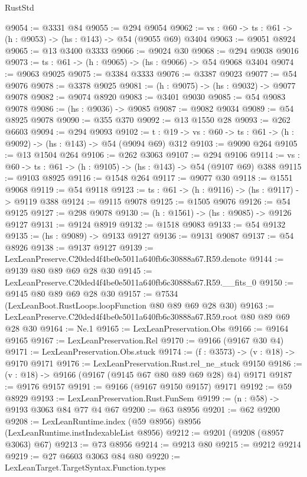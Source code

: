 \begin{lexlean}{RustStd}
\begin{coremodule}
@9054 := @3331 @84
@9055 := @294 @9054
@9062 := {vs : @60} -> {ts : @61} -> (h : @9053) -> (hs : @143) -> @54 (@9055 @69) @3404
@9063 := @9051 @8924
@9065 := @13 @3400 @3333
@9066 := @9024 @30
@9068 := @294 @9038 @9016
@9073 := {ts : @61} -> (h : @9065) -> (hs : @9066) -> @54 @9068 @3404
@9074 := @9063 @9025
@9075 := @3384 @3333
@9076 := @3387 @9023
@9077 := @54 @9076
@9078 := @3378 @9025
@9081 := (h : @9075) -> (hs : @9032) -> @9077 @9078
@9082 := @9074 @8920
@9083 := @3401 @9030
@9085 := @54 @9083 @9078
@9086 := (hs : @9036) -> @9085
@9087 := @9082 @9034
@9089 := @54 @8925 @9078
@9090 := @355 @370
@9092 := @13 @1550 @28
@9093 := @262 @6603
@9094 := @294 @9093
@9102 := {t : @19} -> {vs : @60} -> {ts : @61} -> (h : @9092) -> (hs : @143) -> @54 (@9094 @69) @312
@9103 := @9090 @264
@9105 := @13 @1504 @264
@9106 := @262 @3063
@9107 := @294 @9106
@9114 := {vs : @60} -> {ts : @61} -> (h : @9105) -> (hs : @143) -> @54 (@9107 @69) @388
@9115 := @9103 @8925
@9116 := @1548 @264
@9117 := @9077 @30
@9118 := @1551 @9068
@9119 := @54 @9118
@9123 := {ts : @61} -> (h : @9116) -> (hs : @9117) -> @9119 @388
@9124 := @9115 @9078
@9125 := @1505 @9076
@9126 := @54 @9125
@9127 := @298 @9078
@9130 := (h : @1561) -> (hs : @9085) -> @9126 @9127
@9131 := @9124 @8919
@9132 := @1518 @9083
@9133 := @54 @9132
@9135 := (hs : @9089) -> @9133 @9127
@9136 := @9131 @9087
@9137 := @54 @8926
@9138 := @9137 @9127
@9139 := LexLeanPreserve.C20ded4f4be0e5011a640fb6c30888a67.R59.denote
@9144 := @9139 @80 @89 @69 @28 @30
@9145 := LexLeanPreserve.C20ded4f4be0e5011a640fb6c30888a67.R59.__fits_0
@9150 := @9145 @80 @89 @69 @28 @30
@9157 := @7534 (LexLeanBoot.RustLoops.loopFunction @80 @89 @69 @28 @30)
@9163 := LexLeanPreserve.C20ded4f4be0e5011a640fb6c30888a67.R59.root @80 @89 @69 @28 @30
@9164 := Ne.{1}
@9165 := LexLeanPreservation.Obs
@9166 := @9164 @9165
@9167 := LexLeanPreservation.Rel
@9170 := @9166 (@9167 @30 @4)
@9171 := LexLeanPreservation.Obs.stuck
@9174 := (f : @3573) -> (v : @18) -> @9170 @9171
@9176 := LexLeanPreservation.Rust.rel_ne_stuck @9150
@9186 := (v : @18) -> @9166 (@9167 (@9145 @67 @80 @89 @69 @28) @4) @9171
@9187 := @9176 @9157
@9191 := @9166 (@9167 @9150 @9157) @9171
@9192 := @59 @8929
@9193 := LexLeanPreservation.Rust.FunSem
@9199 := (n : @58) -> @9193 @3063 @84 @77 @4 @67
@9200 := @63 @8956
@9201 := @62 @9200
@9208 := LexLeanRuntime.index (@59 @8956) @8956 (LexLeanRuntime.instIndexableList @8956)
@9212 := @9201 (@9208 (@8957 @3063) @67)
@9213 := @73 @8956
@9214 := @9213 @80
@9215 := @9212 @9214
@9219 := @27 @6603 @3063 @84 @80
@9220 := LexLeanTarget.TargetSyntax.Function.types

\end{coremodule}
\end{lexlean}
